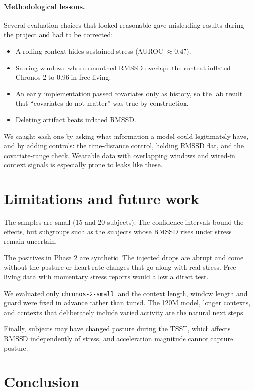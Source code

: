 \documentclass[11pt,a4paper]{article}
\begin{document}
\paragraph{Methodological lessons.} Several evaluation choices that looked reasonable gave misleading results during the project and had to be corrected:
\begin{itemize}
  \item A rolling context hides sustained stress (AUROC $\approx0.47$).
  \item Scoring windows whose smoothed RMSSD overlaps the context inflated Chronos-2 to 0.96 in free living.
  \item An early implementation passed covariates only as history, so the lab result that ``covariates do not matter'' was true by construction.
  \item Deleting artifact beats inflated RMSSD.
\end{itemize}
We caught each one by asking what information a model could legitimately have, and by adding controls: the time-distance control, holding RMSSD flat, and the covariate-range check. Wearable data with overlapping windows and wired-in context signals is especially prone to leaks like these.

\section{Limitations and future work}

The samples are small (15 and 20 subjects). The confidence intervals bound the effects, but subgroups such as the subjects whose RMSSD rises under stress remain uncertain.

The positives in Phase 2 are synthetic. The injected drops are abrupt and come without the posture or heart-rate changes that go along with real stress. Free-living data with momentary stress reports would allow a direct test.

We evaluated only \texttt{chronos-2-small}, and the context length, window length and guard were fixed in advance rather than tuned. The 120M model, longer contexts, and contexts that deliberately include varied activity are the natural next steps.

Finally, subjects may have changed posture during the TSST, which affects RMSSD independently of stress, and acceleration magnitude cannot capture posture.

\section{Conclusion}
\end{document}

